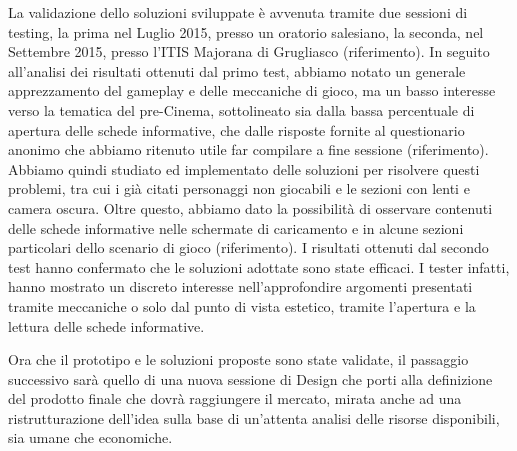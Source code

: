 La validazione dello soluzioni sviluppate è avvenuta tramite due sessioni di testing, la prima nel Luglio 2015, presso un oratorio salesiano, la seconda, nel Settembre 2015, presso l’ITIS Majorana di Grugliasco (riferimento).
In seguito all’analisi dei risultati ottenuti dal primo test, abbiamo notato un generale apprezzamento del gameplay e delle meccaniche di gioco, ma un basso interesse verso la tematica del pre-Cinema, sottolineato sia dalla bassa percentuale di apertura delle schede informative, che dalle risposte fornite al questionario anonimo che abbiamo ritenuto utile far compilare a fine sessione (riferimento).
Abbiamo quindi studiato ed implementato delle soluzioni per risolvere questi problemi, tra cui i già citati personaggi non giocabili e le sezioni con lenti e camera oscura. Oltre questo, abbiamo dato la possibilità di osservare contenuti delle schede informative nelle schermate di caricamento e in alcune sezioni particolari dello scenario di gioco (riferimento).
I risultati ottenuti dal secondo test hanno confermato che le soluzioni adottate sono state efficaci. I tester infatti, hanno mostrato un discreto interesse nell’approfondire argomenti presentati tramite meccaniche o solo dal punto di vista estetico, tramite l’apertura e la lettura delle schede informative.

Ora che il prototipo e le soluzioni proposte sono state validate, il passaggio successivo sarà quello di una nuova sessione di Design che porti alla definizione del prodotto finale che dovrà raggiungere il mercato, mirata anche ad una ristrutturazione dell’idea sulla base di un’attenta analisi delle risorse disponibili, sia umane che economiche. 


